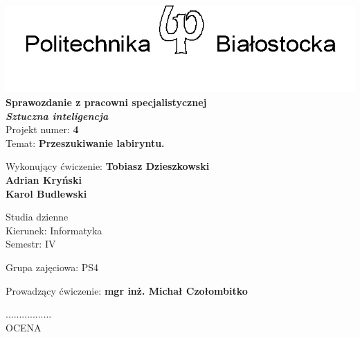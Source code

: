 \documentclass[12pt,a4paper]{article}
\newcommand{\numerzajec}{4}
\newcommand{\tematzajec}{Przeszukiwanie labiryntu.}
\begin{document}
	\thispagestyle{empty}
	\begin{center}
		\vspace*{1.6cm}
		\includegraphics[width=0.55\linewidth]{obrazki/pblogo.png}	\\
		\vspace{0.5cm}
		\large
		\textsf{\textbf{Sprawozdanie z pracowni specjalistycznej}} \\
		\vspace{0.5cm}
		\textsf{\textbf{\textit{Sztuczna inteligencja}}}	\\
		\vspace{1cm}
		\textsf{Projekt numer: \textbf{\numerzajec}}	\\
		\vspace{0.5cm}
		\textsf{Temat: \textbf{\tematzajec}}
	\end{center}

	\vspace{2cm}
	Wykonujący ćwiczenie: \textbf{Tobiasz Dzieszkowski} \\
						  \textbf{Adrian Kryński} \\
						  \textbf{Karol Budlewski}
	\vspace{3.5cm}	

	\begin{minipage}{0.45\linewidth}
		\large
		\begin{spacing}{1.5}
		Studia dzienne \\
		Kierunek: Informatyka \\
		Semestr: IV \\
		\end{spacing}
	\end{minipage}
	\begin{minipage}[t]{0.5\linewidth}
		\large
		\begin{spacing}{1.2}
		Grupa zajęciowa: PS4
		\end{spacing}
	\end{minipage}
	
	Prowadzący ćwiczenie: \textbf{mgr inż. Michał Czołombitko} \\
	
	\begin{flushright}
		\begin{minipage}[t]{0.3\linewidth}
			\centering
			................. \\
			\small OCENA
		\end{minipage}
	\end{flushright}
	
\end{document}
